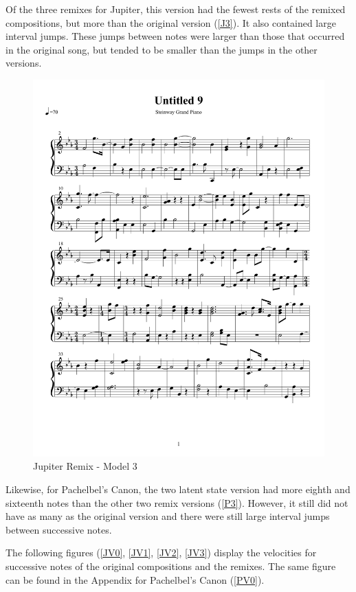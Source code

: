 \documentclass{article} %
\begin{document}
Of the three remixes for Jupiter, this version had the fewest rests of the remixed compositions, but more than the original version (\autoref{J3}). It also contained large interval jumps. These jumps between notes were larger than those that occurred in the original song, but tended to be smaller than the jumps in the other versions. 


\begin{figure}[H]
\centering

\includegraphics [scale = 0.6] {JupiterRemix2H-cropped.pdf}
\caption{Jupiter Remix - Model 3\label{J3}}
\end{figure}

Likewise, for Pachelbel's Canon, the two latent state version had more eighth and sixteenth notes than the other two remix versions (\autoref{P3}). However, it still did not have as many as the original version and there were still large interval jumps  between successive notes. 

The following figures (\autoref{JV0}, \autoref{JV1}, \autoref{JV2}, \autoref{JV3}) display the velocities for successive notes of the original compositions and the remixes. The same figure can be found in the Appendix for  Pachelbel's Canon (\autoref{PV0}). 
\end{document}
